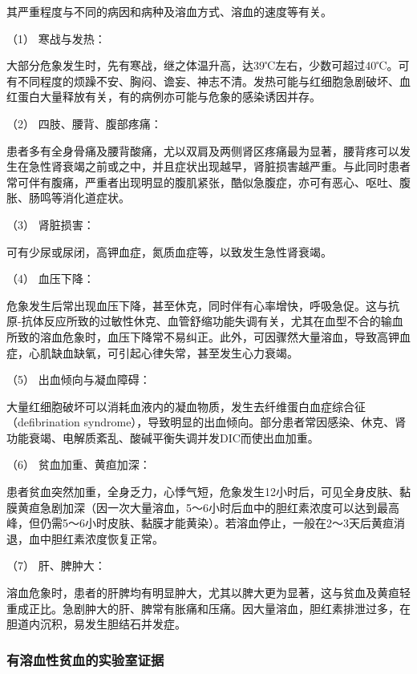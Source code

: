 其严重程度与不同的病因和病种及溶血方式、溶血的速度等有关。

\hypertarget{text00126.htmlux5cux23CHP4-16-2-2-2-1}{}
（1） 寒战与发热：

大部分危象发生时，先有寒战，继之体温升高，达39℃左右，少数可超过40℃。可有不同程度的烦躁不安、胸闷、谵妄、神志不清。发热可能与红细胞急剧破坏、血红蛋白大量释放有关，有的病例亦可能与危象的感染诱因并存。

\hypertarget{text00126.htmlux5cux23CHP4-16-2-2-2-2}{}
（2） 四肢、腰背、腹部疼痛：

患者多有全身骨痛及腰背酸痛，尤以双肩及两侧肾区疼痛最为显著，腰背疼可以发生在急性肾衰竭之前或之中，并且症状出现越早，肾脏损害越严重。与此同时患者常可伴有腹痛，严重者出现明显的腹肌紧张，酷似急腹症，亦可有恶心、呕吐、腹胀、肠鸣等消化道症状。

\hypertarget{text00126.htmlux5cux23CHP4-16-2-2-2-3}{}
（3） 肾脏损害：

可有少尿或尿闭，高钾血症，氮质血症等，以致发生急性肾衰竭。

\hypertarget{text00126.htmlux5cux23CHP4-16-2-2-2-4}{}
（4） 血压下降：

危象发生后常出现血压下降，甚至休克，同时伴有心率增快，呼吸急促。这与抗原-抗体反应所致的过敏性休克、血管舒缩功能失调有关，尤其在血型不合的输血所致的溶血危象时，血压下降常不易纠正。此外，可因骤然大量溶血，导致高钾血症，心肌缺血缺氧，可引起心律失常，甚至发生心力衰竭。

\hypertarget{text00126.htmlux5cux23CHP4-16-2-2-2-5}{}
（5） 出血倾向与凝血障碍：

大量红细胞破坏可以消耗血液内的凝血物质，发生去纤维蛋白血症综合征（defibrination
syndrome），导致明显的出血倾向。部分患者常因感染、休克、肾功能衰竭、电解质紊乱、酸碱平衡失调并发DIC而使出血加重。

\hypertarget{text00126.htmlux5cux23CHP4-16-2-2-2-6}{}
（6） 贫血加重、黄疸加深：

患者贫血突然加重，全身乏力，心悸气短，危象发生12小时后，可见全身皮肤、黏膜黄疸急剧加深（因一次大量溶血，5～6小时后血中的胆红素浓度可以达到最高峰，但仍需5～6小时皮肤、黏膜才能黄染）。若溶血停止，一般在2～3天后黄疸消退，血中胆红素浓度恢复正常。

\hypertarget{text00126.htmlux5cux23CHP4-16-2-2-2-7}{}
（7） 肝、脾肿大：

溶血危象时，患者的肝脾均有明显肿大，尤其以脾大更为显著，这与贫血及黄疸轻重成正比。急剧肿大的肝、脾常有胀痛和压痛。因大量溶血，胆红素排泄过多，在胆道内沉积，易发生胆结石并发症。

\subsubsection{有溶血性贫血的实验室证据}

